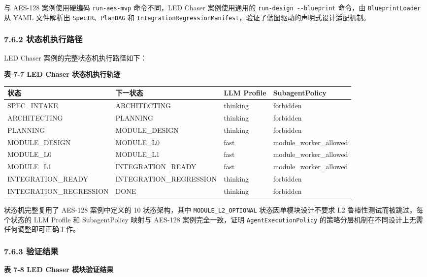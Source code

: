 与 AES-128 案例使用硬编码 \texttt{run-aes-mvp} 命令不同，LED Chaser
案例使用通用的 \texttt{run-design\ -\/-blueprint} 命令，由
\texttt{BlueprintLoader} 从 YAML 文件解析出
\texttt{SpecIR}、\texttt{PlanDAG} 和
\texttt{IntegrationRegressionManifest}，验证了蓝图驱动的声明式设计适配机制。

\subsubsection{7.6.2
状态机执行路径}\label{ux72b6ux6001ux673aux6267ux884cux8defux5f84}

LED Chaser 案例的完整状态机执行路径如下：

\textbf{表 7-7 LED Chaser 状态机执行轨迹}

{\def\LTcaptype{none} %
\begin{longtable}[]{@{}llll@{}}
\toprule\noalign{}
状态 & 下一状态 & LLM Profile & SubagentPolicy \\
\midrule\noalign{}
\endhead
\bottomrule\noalign{}
\endlastfoot
SPEC\_INTAKE & ARCHITECTING & thinking & forbidden \\
ARCHITECTING & PLANNING & thinking & forbidden \\
PLANNING & MODULE\_DESIGN & thinking & forbidden \\
MODULE\_DESIGN & MODULE\_L0 & fast & module\_worker\_allowed \\
MODULE\_L0 & MODULE\_L1 & fast & module\_worker\_allowed \\
MODULE\_L1 & INTEGRATION\_READY & fast & module\_worker\_allowed \\
INTEGRATION\_READY & INTEGRATION\_REGRESSION & thinking & forbidden \\
INTEGRATION\_REGRESSION & DONE & thinking & forbidden \\
\end{longtable}
}

状态机完整复用了 AES-128 案例中定义的 10 状态架构，其中
\texttt{MODULE\_L2\_OPTIONAL} 状态因单模块设计不要求 L2
鲁棒性测试而被跳过。每个状态的 LLM Profile 和 SubagentPolicy 映射与
AES-128 案例完全一致，证明 \texttt{AgentExecutionPolicy}
的策略分层机制在不同设计上无需任何调整即可正确工作。

\subsubsection{7.6.3 验证结果}\label{ux9a8cux8bc1ux7ed3ux679c}

\textbf{表 7-8 LED Chaser 模块验证结果}

